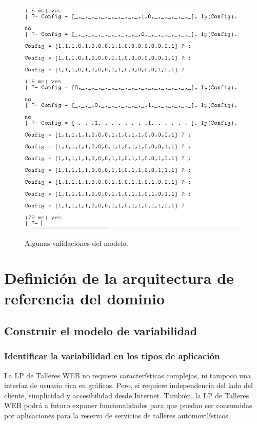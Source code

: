 \documentclass[10pt,a4paper,openany]{book}
\begin{document}
\begin{figure}[h]
	\centering
	\caption{Algunas validaciones del modelo.}
	\includegraphics[width=1\textwidth]{gnu2}
	\label{fig:gnu2}
\end{figure}



\section{Definición de la arquitectura de referencia del dominio}

\subsection{Construir el modelo de variabilidad}
\subsubsection{Identificar la variabilidad en los tipos de aplicación}
La LP de Talleres WEB no requiere características complejas, ni tampoco una interfaz de usuario rica en gráficos. Pero, si requiere independencia del lado del cliente, simplicidad y accesibilidad desde Internet. También, la LP de Talleres WEB podrá a futuro exponer funcionalidades para que puedan ser consumidas por aplicaciones para la reserva de servicios de talleres automovilísticos.\\
\end{document}
